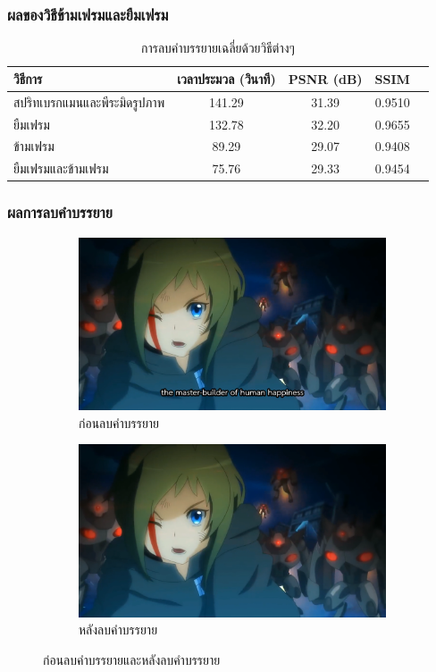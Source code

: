 \documentclass[xcolor=dvipsnames, xetex,serif]{beamer}
\numberwithin{equation}{section}
\begin{document}
		\begin{frame}
			\frametitle{ผลของวิธีข้ามเฟรมและยืมเฟรม}
			\begin{table}[H]
				\centering
				\begin{tabular}[ht]{|l|c|c|c|c|}
					\hline
					วิธีการ  & เวลาประมวล  (วินาที) & PSNR (dB) & SSIM \\
					\hline
					สปริทเบรกแมนและพีระมิดรูปภาพ & 141.29 & 31.39  &  0.9510\\
					ยืมเฟรม & 132.78 & 32.20 & 0.9655\\
					ข้ามเฟรม & 89.29 & 29.07 & 0.9408 \\
					ยืมเฟรมและข้ามเฟรม & 75.76 & 29.33 & 0.9454 \\
					\hline
				\end{tabular}
				\caption{การลบคำบรรยายเฉลี่ยด้วยวิธีต่างๆ}
			\end{table}	
		\end{frame}
		\begin{frame}
			\frametitle{ผลการลบคำบรรยาย}
			\begin{figure}[H]
				\centering
				\begin{subfigure}{0.4\linewidth}
					\centering
					\includegraphics[width=0.80\linewidth]{images/subtitle-remove/beforesubtitleremove.png}
					\caption{ก่อนลบคำบรรยาย}
					\label{image:ssim_location_prev}
				\end{subfigure}
				\begin{subfigure}{0.4\linewidth}
					\centering
					\includegraphics[width=0.80\linewidth]{images/subtitle-remove/aftersubtitleremove.png}
					\caption{หลังลบคำบรรยาย}
					\label{image:ssim_location_curr}
				\end{subfigure}
				\caption{ก่อนลบคำบรรยายและหลังลบคำบรรยาย}
			\end{figure}
		\end{frame}
\end{document}
